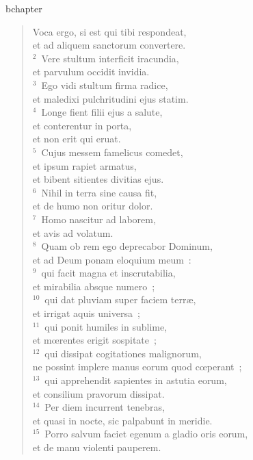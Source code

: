 bchapter\begin{flushleft}\begin{verse}\vspace{-19pt}Voca ergo, si est qui tibi respondeat,\\ et ad aliquem sanctorum convertere.\\
${}^{2}$~Vere stultum interficit iracundia,\\ et parvulum occidit invidia.\\
${}^{3}$~Ego vidi stultum firma radice,\\ et maledixi pulchritudini ejus statim.\\
${}^{4}$~Longe fient filii ejus a salute,\\ et conterentur in porta,\\ et non erit qui eruat.\\
${}^{5}$~Cujus messem famelicus comedet,\\ et ipsum rapiet armatus,\\ et bibent sitientes divitias ejus.\\
${}^{6}$~Nihil in terra sine causa fit,\\ et de humo non oritur dolor.\\
${}^{7}$~Homo nascitur ad laborem,\\ et avis ad volatum.\\
${}^{8}$~Quam ob rem ego deprecabor Dominum,\\ et ad Deum ponam eloquium meum~:\\
${}^{9}$~qui facit magna et inscrutabilia,\\ et mirabilia absque numero~;\\
${}^{10}$~qui dat pluviam super faciem terr\ae ,\\ et irrigat aquis universa~;\\
${}^{11}$~qui ponit humiles in sublime,\\ et mœrentes erigit sospitate~;\\
${}^{12}$~qui dissipat cogitationes malignorum,\\ ne possint implere manus eorum quod cœperant~;\\
${}^{13}$~qui apprehendit sapientes in astutia eorum,\\ et consilium pravorum dissipat.\\
${}^{14}$~Per diem incurrent tenebras,\\ et quasi in nocte, sic palpabunt in meridie.\\
${}^{15}$~Porro salvum faciet egenum a gladio oris eorum,\\ et de manu violenti pauperem.\\

\end{verse}
\end{flushleft}
